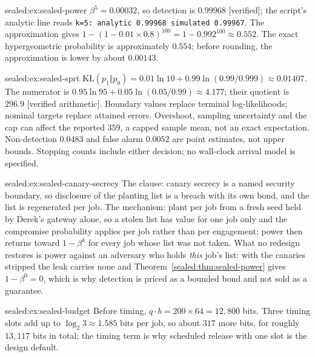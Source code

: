 \begin{pdSolution}{sealed:ex:sealed-power}
$\beta^5=0.00032$, so detection is $0.99968$ [verified]; the script's analytic
line reads \texttt{k=5: analytic 0.99968 simulated 0.99967}. The approximation
gives $1-(1-0.01\times0.8)^{100}=1-0.992^{100}\approx0.552$.
The exact hypergeometric probability is approximately $0.554$; before rounding,
the approximation is lower by about $0.00143$.
\end{pdSolution}
\begin{pdSolution}{sealed:ex:sealed-sprt}
\relax
$\mathrm{KL}(p_1\Vert p_0)=0.01\ln10+0.99\ln(0.99/0.999)\approx0.01407$.
The numerator is $0.95\ln95+0.05\ln(0.05/0.99)\approx4.177$;
their quotient is $296.9$ [verified arithmetic]. Boundary values replace terminal
log-likelihoods; nominal targets replace attained errors. Overshoot, sampling
uncertainty and the cap can affect the reported $359$, a capped sample mean, not an
exact expectation. Non-detection
$0.0483$ and false alarm $0.0052$ are point estimates, not upper bounds.
Stopping counts include either decision; no wall-clock arrival model is specified.
\end{pdSolution}
\begin{pdSolution}{sealed:ex:sealed-canary-secrecy}
The clause: canary secrecy is a named security boundary, so disclosure of the
planting list is a breach with its own bond, and the list is regenerated per
job. The mechanism: plant per job from a fresh seed held by Derek's gateway
alone, so a stolen list has value for one job only and the compromise
probability applies per job rather than per engagement; power then returns
toward $1-\beta^k$ for every job whose list was not taken. What no redesign
restores is power against an adversary who holds \emph{this} job's list: with
the canaries stripped the leak carries none and Theorem~\ref{sealed:thm:sealed-power}
gives $1-\beta^0=0$, which is why detection is priced as a bounded bond and not
sold as a guarantee.
\end{pdSolution}
\begin{pdSolution}{sealed:ex:sealed-budget}
Before timing, $q\cdot b=200\times64=12{,}800$ bits. Three timing slots add up
to $\log_2 3\approx1.585$ bits per job, so about $317$ more bits, for roughly
$13{,}117$ bits in total; the timing term is why scheduled release with one
slot is the design default.
\end{pdSolution}
